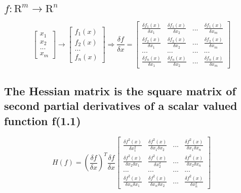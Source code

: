 \documentclass[12pt,letterpaper]{article}
\begin{document}
\subsection{$f: \mathrm{R}^m \rightarrow \mathrm{R}^n$}
    $$
    \begin{bmatrix}
        x_1\\
        x_2\\
        ...\\
        x_m
    \end{bmatrix}
    \rightarrow
    \begin{bmatrix}
        f_1(x)\\
        f_2(x)\\
        ...\\
        f_n(x)
    \end{bmatrix}
    \Rightarrow
    \frac{\delta f}{\delta x} = \begin{bmatrix}
                                    \frac{\delta f_1(x)}{\delta x_1} & \frac{\delta f_1(x)}{\delta x_2} & ... & \frac{\delta f_1(x)}{\delta x_m}\\
                                    \frac{\delta f_2(x)}{\delta x_1} & \frac{\delta f_2(x)}{\delta x_2} & ... & \frac{\delta f_2(x)}{\delta x_m}\\
                                                                 ... &                              ... & ... &                             ... \\
                                    \frac{\delta f_n(x)}{\delta x_1} & \frac{\delta f_n(x)}{\delta x_2} & ... & \frac{\delta f_n(x)}{\delta x_m}
                                \end{bmatrix}   
    $$

\subsection{The Hessian matrix is the square matrix of second partial derivatives of a scalar valued function f(1.1)}
    $$
    H(f) = (\frac{\delta f}{\delta x})^T\frac{\delta f}{\delta x}
    \begin{bmatrix}
        \frac{\delta f^2(x)}{\delta x_1^2} & \frac{\delta f^2(x)}{\delta x_1\delta x_2} & ... & \frac{\delta f^2(x)}{\delta x_1\delta x_n}\\
        \frac{\delta f^2(x)}{\delta x_2\delta x_1} & \frac{\delta f^2(x)}{\delta x_2^2} & ... & \frac{\delta f^2(x)}{\delta x_2\delta x_n}\\
                                     ... &                              ... & ... &                             ... \\
        \frac{\delta f^2(x)}{\delta x_n\delta x_1} & \frac{\delta f^2(x)}{\delta x_n\delta x_2} & ... & \frac{\delta f^2(x)}{\delta x_n^2}
    \end{bmatrix} 
    $$
\end{document}
